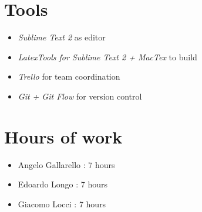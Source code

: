 \newpage
\begin{appendices}
\section{Tools}

\begin{itemize}
	\item \emph{Sublime Text 2} as editor
	\item \emph{LatexTools for Sublime Text 2 + MacTex}  to build
	\item \emph{Trello} for team coordination 
	\item \emph{Git + Git Flow} for version control 
\end{itemize}

\section{Hours of work}

\begin{itemize}
	\item Angelo Gallarello : 7 hours
	\item Edoardo Longo : 7 hours
	\item Giacomo Locci : 7 hours
\end{itemize}




\end{appendices}